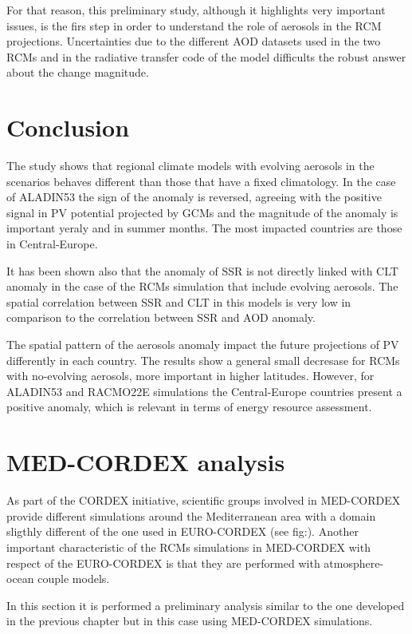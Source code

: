 For that reason, this preliminary study, although it highlights very important issues, is the firs step in order to understand the role of aerosols in the RCM projections. Uncertainties due to the different AOD datasets used in the two RCMs and in the radiative transfer code of the model difficults the robust answer about the change magnitude. 

\section{Conclusion}

The study shows that regional climate models with evolving aerosols in the scenarios behaves different than those that have a fixed climatology. In the case of ALADIN53 the sign of the anomaly is reversed, agreeing with the positive signal in PV potential projected by GCMs and the magnitude of the anomaly is important yeraly and in summer months. The most impacted countries are those in Central-Europe.

It has been shown also that the anomaly of SSR is not directly linked with CLT anomaly in the case of the RCMs simulation that include evolving aerosols. The spatial correlation between SSR and CLT in this models is very low in comparison to the correlation between SSR and AOD anomaly.

The spatial pattern of the aerosols anomaly impact the future projections of PV differently in each country. The results show a general small decresase for RCMs with no-evolving aerosols, more important in higher latitudes. However, for ALADIN53 and RACMO22E simulations the Central-Europe countries present a positive anomaly, which is relevant in terms of energy resource assessment.

\appendix

\section{MED-CORDEX analysis}

As part of the CORDEX initiative, scientific groups involved in MED-CORDEX provide different simulations around the Mediterranean area with a domain sligthly different of the one used in EURO-CORDEX (see fig:). Another important characteristic of the RCMs simulations in MED-CORDEX with respect of the EURO-CORDEX is that they are performed with atmosphere-ocean couple models.

In this section it is performed a preliminary analysis similar to the one developed in the previous chapter but in this case using MED-CORDEX simulations.

